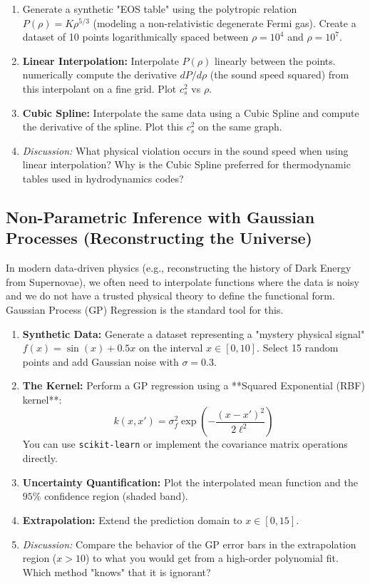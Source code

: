 \begin{enumerate}
    \item Generate a synthetic "EOS table" using the polytropic relation $P(\rho) = K \rho^{5/3}$ (modeling a non-relativistic degenerate Fermi gas). Create a dataset of 10 points logarithmically spaced between $\rho = 10^4$ and $\rho = 10^7$.
    \item \textbf{Linear Interpolation:} Interpolate $P(\rho)$ linearly between the points. numerically compute the derivative $dP/d\rho$ (the sound speed squared) from this interpolant on a fine grid. Plot $c_s^2$ vs $\rho$.
    \item \textbf{Cubic Spline:} Interpolate the same data using a Cubic Spline and compute the derivative of the spline. Plot this $c_s^2$ on the same graph.
    \item \textit{Discussion:} What physical violation occurs in the sound speed when using linear interpolation? Why is the Cubic Spline preferred for thermodynamic tables used in hydrodynamics codes?
\end{enumerate}

\vspace{0.5cm}

\subsection{Non-Parametric Inference with Gaussian Processes (Reconstructing the Universe)}

In modern data-driven physics (e.g., reconstructing the history of Dark Energy from Supernovae), we often need to interpolate functions where the data is noisy and we do not have a trusted physical theory to define the functional form. Gaussian Process (GP) Regression is the standard tool for this.

\begin{enumerate}
    \item \textbf{Synthetic Data:} Generate a dataset representing a "mystery physical signal" $f(x) = \sin(x) + 0.5 x$ on the interval $x \in [0, 10]$. Select 15 random points and add Gaussian noise with $\sigma = 0.3$.
    \item \textbf{The Kernel:} Perform a GP regression using a **Squared Exponential (RBF) kernel**:
    $$ k(x, x') = \sigma_f^2 \exp\left( -\frac{(x-x')^2}{2\ell^2} \right) $$
    You can use \texttt{scikit-learn} or implement the covariance matrix operations directly.
    \item \textbf{Uncertainty Quantification:} Plot the interpolated mean function and the $95\%$ confidence region (shaded band).
    \item \textbf{Extrapolation:} Extend the prediction domain to $x \in [0, 15]$.
    \item \textit{Discussion:} Compare the behavior of the GP error bars in the extrapolation region ($x > 10$) to what you would get from a high-order polynomial fit. Which method "knows" that it is ignorant?
\end{enumerate}


